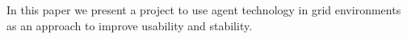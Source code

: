\fontsize{9}{11}\selectfont In this paper we present a project to use agent technology in grid environments as an approach to improve usability and stability. 
